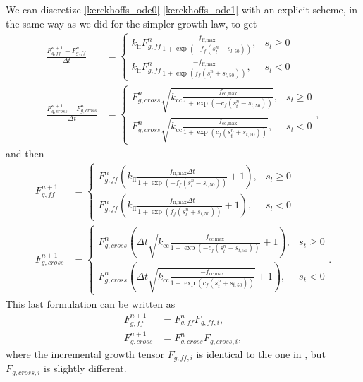 \documentclass[a4paper,10pt]{article}
\begin{document}
We can discretize \eqref{kerckhoffs_ode0}-\eqref{kerckhoffs_ode1} with an explicit scheme, in the same way as we did for the
simpler growth law, to get
\begin{align}
  \frac{F_{g,ff}^{n+1} - F_{g,ff}^{n}}{\Delta t} &= \begin{cases}
    k_\text{ff} F_{g,ff}^n \frac{f_\text{ff,max} }{1 + \exp(-f_f(s_l^n - s_{l,50}))}, & s_l \geq 0 \\
    k_\text{ff} F_{g,ff}^n \frac{-f_\text{ff,max} }{1 + \exp(f_f(s_l^n + s_{l,50}))}, & s_l < 0
    \end{cases} \label{kerckhoffs_disc0}\\
    \frac{F_{g,cross}^{n+1}- F_{g,cross}^n}{\Delta t} &=
\begin{cases}
  F_{g,cross}^n \sqrt{k_\text{cc} \frac{f_\text{cc,max}  }{1 + \exp(-c_f(s_t^n - s_{t,50}))}}, & s_t \geq 0 \\
  F_{g,cross}^n \sqrt{k_\text{cc} \frac{-f_\text{cc,max} }{1 + \exp(c_f(s_t^n + s_{t,50}))}}, & s_t < 0
\end{cases}, \label{kerckhoffs_disc1}
\end{align}
and then
\begin{align}
  F_{g,ff}^{n+1} &= \begin{cases}
    F_{g,ff}^n (k_\text{ff} \frac{f_\text{ff,max} \Delta t}{1 + \exp(-f_f(s_l^n - s_{l,50}))} + 1), & s_l \geq 0 \\
    F_{g,ff}^n (k_\text{ff} \frac{-f_\text{ff,max} \Delta t}{1 + \exp(f_f(s_l^n + s_{l,50}))} + 1), & s_l < 0
    \end{cases} \label{kerckhoffs_inc0}\\
    F_{g,cross}^{n+1} &=
\begin{cases}
  F_{g,cross}^n (\Delta t \sqrt{k_\text{cc} \frac{f_\text{cc,max} }{1 + \exp(-c_f(s_t^n - s_{t,50}))}}+1), & s_t \geq 0 \\
  F_{g,cross}^n (\Delta t \sqrt{k_\text{cc}\frac{-f_\text{cc,max}}{1 + \exp(c_f(s_t^n + s_{t,50}))}}+ 1), & s_t < 0
\end{cases}. \label{kerckhoffs_inc1}
\end{align}
This last formulation can be written as
\begin{align}
  F_{g,ff}^{n+1} &= F_{g,ff}^n F_{g,ff,i},\\
  F_{g,cross}^{n+1} &= F_{g,cross}^n F_{g,cross,i},
\end{align}
where the incremental growth tensor $F_{g,ff,i}$ is identical to the one in \cite{Kerckhoffs2012MRC},
but $F_{g,cross,i}$ is slightly different. 
\end{document}
